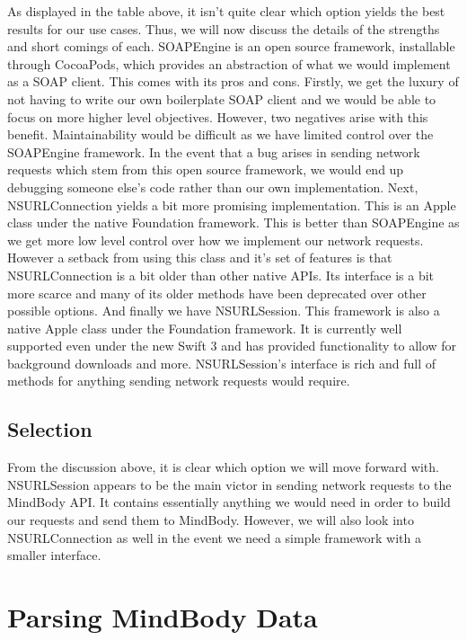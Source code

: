 \documentclass[letterpaper,10pt,titlepage]{article}
\begin{document}
As displayed in the table above, it isn't quite clear which option yields the best results for our use cases. Thus, we will now discuss the details of the strengths and short comings of each. SOAPEngine is an open source framework, installable through CocoaPods, which provides an abstraction of what we would implement as a SOAP client. This comes with its pros and cons. Firstly, we get the luxury of not having to write our own boilerplate SOAP client and we would be able to focus on more higher level objectives. However, two negatives arise with this benefit. Maintainability would be difficult as we have limited control over the SOAPEngine framework. In the event that a bug arises in sending network requests which stem from this open source framework, we would end up debugging someone else's code rather than our own implementation. Next, NSURLConnection yields a bit more promising implementation. This is an Apple class under the native Foundation framework. This is better than SOAPEngine as we get more low level control over how we implement our network requests. However a setback from using this class and it's set of features is that NSURLConnection is a bit older than other native APIs. Its interface is a bit more scarce and many of its older methods have been deprecated over other possible options. And finally we have NSURLSession. This framework is also a native Apple class under the Foundation framework. It is currently well supported even under the new Swift 3 and has provided functionality to allow for background downloads and more. NSURLSession's interface is rich and full of methods for anything sending network requests would require.

\subsection{Selection}

From the discussion above, it is clear which option we will move forward with. NSURLSession appears to be the main victor in sending network requests to the MindBody API. It contains essentially anything we would need in order to build our requests and send them to MindBody. However, we will also look into NSURLConnection as well in the event we need a simple framework with a smaller interface.

\section{Parsing MindBody Data}
\end{document}
